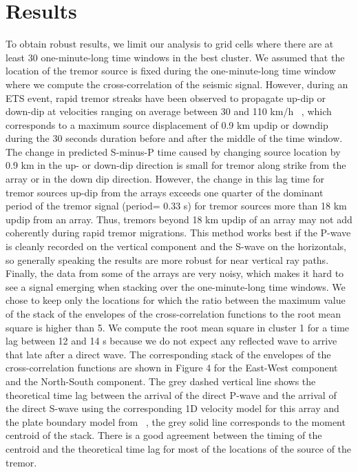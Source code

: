 \documentclass[draft]{agujournal2019}
\begin{document}
\section{Results}

To obtain robust results, we limit our analysis to grid cells where there are at least 30 one-minute-long time windows in the best cluster. We assumed that the location of the tremor source is fixed during the one-minute-long time window where we compute the cross-correlation of the seismic signal. However, during an ETS event, rapid tremor streaks have been observed to propagate up-dip or down-dip at velocities ranging on average between 30 and 110 km/h ~\cite{GHO_2010_G3}, which corresponds to a maximum source displacement of 0.9 km updip or downdip during the 30 seconds duration before and after the middle of the time window. The change in predicted S-minus-P time caused by changing source location by 0.9 km in the up- or down-dip direction is small for tremor along strike from the array or in the down dip direction.  However, the change in this lag time for tremor sources up-dip from the arrays exceeds one quarter of the dominant period of the tremor signal (period= 0.33 s) for tremor sources more than 18 km updip from an array. Thus, tremors beyond 18 km updip of an array may not add coherently during rapid tremor migrations. This method works best if the P-wave is cleanly recorded on the vertical component and the S-wave on the horizontals, so generally speaking the results are more robust for near vertical ray paths. \\

Finally, the data from some of the arrays are very noisy, which makes it hard to see a signal emerging when stacking over the one-minute-long time windows. We chose to keep only the locations for which the ratio between the maximum value of the stack of the envelopes of the cross-correlation functions to the root mean square is higher than 5. We compute the root mean square in cluster 1 for a time lag between 12 and 14 s because we do not expect any reflected wave to arrive that late after a direct wave. The corresponding stack of the envelopes of the cross-correlation functions are shown in Figure 4 for the East-West component and the North-South component. The grey dashed vertical line shows the theoretical time lag between the arrival of the direct P-wave and the arrival of the direct S-wave using the corresponding 1D velocity model for this array and the plate boundary model from ~, the grey solid line corresponds to the moment centroid of the stack. There is a good agreement between the timing of the centroid and the theoretical time lag for most of the locations of the source of the tremor. \\
\end{document}
